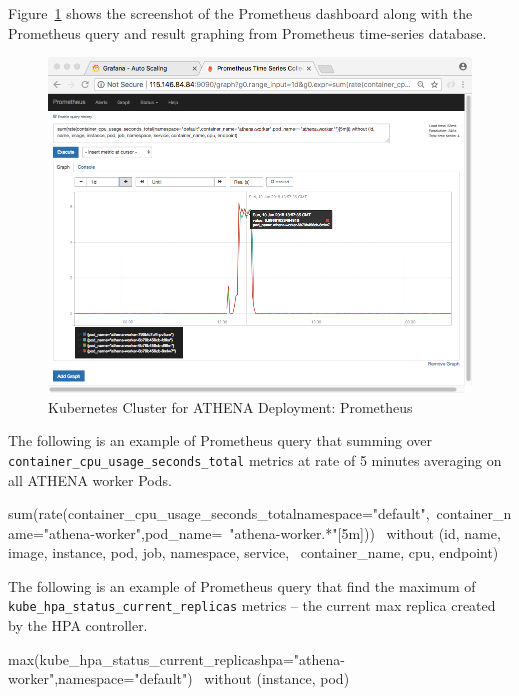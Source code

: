 Figure~\ref{fig:kubeAthenaProm} shows the screenshot of the Prometheus dashboard along with the Prometheus query and result graphing from Prometheus time-series database.

\begin{figure}[H]
\centering
\includegraphics[width=0.7\paperwidth]{Figures/KUBE_ATHENA_prometheus}
\decoRule
\caption[Kubernetes Cluster for ATHENA Deployment: Prometheus]{Kubernetes Cluster for ATHENA Deployment: Prometheus}
\label{fig:kubeAthenaProm}
\end{figure}

The following is an example of Prometheus query that summing over
\\
\verb|container_cpu_usage_seconds_total| metrics at rate of 5 minutes averaging on all ATHENA worker Pods.

\begin{small}
\begin{lcverbatim}
sum(rate(container_cpu_usage_seconds_total{namespace="default",\
	container_name="athena-worker",pod_name=~"athena-worker.*"}[5m])) \
	without (id, name, image, instance, pod, job, namespace, service, \
	container_name, cpu, endpoint)
\end{lcverbatim}
\end{small}

The following is an example of Prometheus query that find the maximum of 
\\
\verb|kube_hpa_status_current_replicas| metrics -- the current max replica created by the HPA controller.

\begin{small}
\begin{lcverbatim}
max(kube_hpa_status_current_replicas{hpa="athena-worker",namespace="default"}) \
	without (instance, pod)
\end{lcverbatim}
\end{small}

